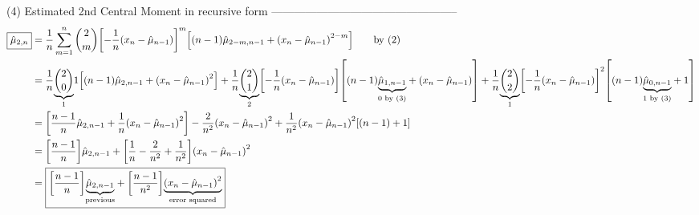 (4) Estimated 2nd Central Moment in recursive form
--------------------------------------------------
\begin{align*}
\boxed{\hat{\mu}_{2,n}}
  &= \frac{1}{n}\sum_{m=1}^n {2\choose m} {\left[ -\frac{1}{n}{\left(x_n-\hat{\mu}_{n-1}\right)} \right]}^m {\left[ (n-1) \hat{\mu}_{2-m,n-1} + {\left( x_n - \hat{\mu}_{n-1} \right)}^{2-m} \right]}
     \qquad\text{by (2)}
  \\&= \frac{1}{n}{\displaystyle\underbrace{\displaystyle{2\choose0}}_{\text{1}}} 1 {\left[ (n-1) \hat{\mu}_{2,n-1} + {\left( x_n - \hat{\mu}_{n-1} \right)}^{2} \right]} 
     + \frac{1}{n}{\displaystyle\underbrace{\displaystyle{2\choose1}}_{\text{2}}} {\left[ -\frac{1}{n}{\left(x_n-\hat{\mu}_{n-1}\right)} \right]}{\left[ (n-1) {\displaystyle\underbrace{\displaystyle\hat{\mu}_{1,n-1}}_{\text{0 by (3)}}} + {\left( x_n - \hat{\mu}_{n-1} \right)} \right]} 
     + \frac{1}{n}{\displaystyle\underbrace{\displaystyle{2\choose2}}_{\text{1}}} {\left[ -\frac{1}{n}{\left(x_n-\hat{\mu}_{n-1}\right)} \right]}^2 {\left[ (n-1) {\displaystyle\underbrace{\displaystyle\hat{\mu}_{0,n-1}}_{\text{1 by (3)}}} + 1 \right]}
  \\&= {\left[\frac{n-1}{n} \hat{\mu}_{2,n-1}
     + \frac{1}{n}{\left( x_n - \hat{\mu}_{n-1} \right)}^2\right]}
     -\frac{2}{n^2} {\left( x_n - \hat{\mu}_{n-1} \right)}^2 +\frac{1}{n^2} {\left( x_n - \hat{\mu}_{n-1} \right)}^2 {\left[ (n-1) + 1 \right]}
  \\&= {\left[\frac{n-1}{n}\right]}\hat{\mu}_{2,n-1} + {\left[ \frac{1}{n} - \frac{2}{n^2} + \frac{1}{n^2} \right]} {\left( x_n - \hat{\mu}_{n-1} \right)}^2
  \\&= \boxed{{\left[\frac{n-1}{n}\right]}{\displaystyle\underbrace{\displaystyle\hat{\mu}_{2,n-1}}_{\text{previous}}} 
     + {\left[ \frac{n-1}{n^2} \right]} {\displaystyle\underbrace{\displaystyle{\left( x_n - \hat{\mu}_{n-1} \right)}^2}_{\text{error squared}}}}
\end{align*}


